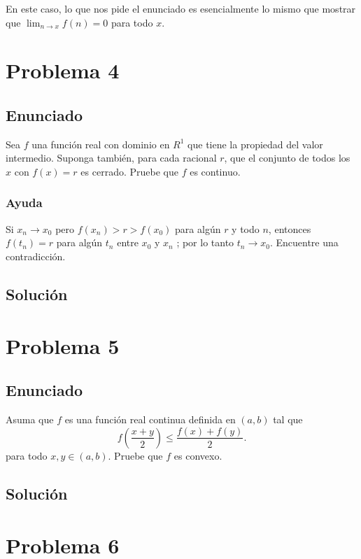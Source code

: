 \documentclass{report}
\begin{document}
En este caso, lo que nos pide el enunciado es esencialmente lo mismo que mostrar que $\displaystyle \lim_{n \to x} f\left( n \right) = 0 $ para todo $x$.

\chapter{Problema 4}
\section{Enunciado}


Sea $f$ una función real con dominio en $R^{1}$ que tiene la propiedad del valor intermedio. Suponga también, para cada racional $r$, que el conjunto de todos los $x$ con $f(x)=r$ es cerrado. Pruebe que $f$ es continuo.

\subsection{Ayuda}
Si $x_n \to x_0$ pero $f\left( x_n \right) > r > f\left( x_0 \right) $ para algún $r$ y todo $n$, entonces  $f\left( t_n \right) = r$ para algún $t_n$ entre $x_0$ y $x_n$ ; por lo tanto $t_n \to  x_0$. Encuentre una contradicción.

\section{Solución}

\chapter{Problema 5}
\section{Enunciado}

Asuma que $f$ es una función real continua definida en $\left( a, b \right) $ tal que \[
f\left( \frac{x + y}{2} \right) \le \frac{f(x) + f(y)}{2}
.\] para todo $x, y \in \left( a,b \right) $. Pruebe que $f$ es convexo.
\section{Solución}


\chapter{Problema 6}
\end{document}
